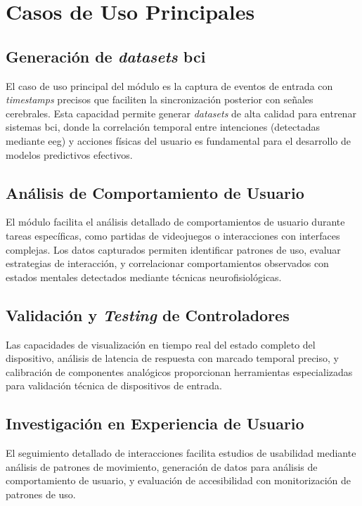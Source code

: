 

\section{Casos de Uso Principales}
\label{sec:casos_uso_input}

\subsection{Generación de \textit{\glspl{dataset}} \acrshort{bci}}
\label{subsec:generacion_datasets_bci}

El caso de uso principal del módulo es la captura de eventos de entrada con \textit{\glspl{timestamp}} precisos que faciliten la sincronización posterior con señales cerebrales. Esta capacidad permite generar \textit{\glspl{dataset}} de alta calidad para entrenar sistemas \acrshort{bci}, donde la correlación temporal entre intenciones (detectadas mediante \acrshort{eeg}) y acciones físicas del usuario es fundamental para el desarrollo de modelos predictivos efectivos.

\subsection{Análisis de Comportamiento de Usuario}
\label{subsec:analisis_comportamiento_usuario}

El módulo facilita el análisis detallado de comportamientos de usuario durante tareas específicas, como partidas de videojuegos o interacciones con interfaces complejas. Los datos capturados permiten identificar patrones de uso, evaluar estrategias de interacción, y correlacionar comportamientos observados con estados mentales detectados mediante técnicas neurofisiológicas.

\subsection{Validación y \textit{Testing} de Controladores}
\label{subsec:validacion_testing}

Las capacidades de visualización en tiempo real del estado completo del dispositivo, análisis de latencia de respuesta con marcado temporal preciso, y calibración de componentes analógicos proporcionan herramientas especializadas para validación técnica de dispositivos de entrada.

\subsection{Investigación en Experiencia de Usuario}
\label{subsec:investigacion_experiencia}

El seguimiento detallado de interacciones facilita estudios de usabilidad mediante análisis de patrones de movimiento, generación de datos para análisis de comportamiento de usuario, y evaluación de accesibilidad con monitorización de patrones de uso.
